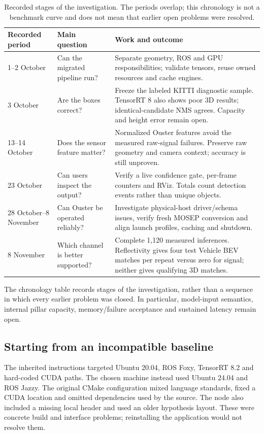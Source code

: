 \documentclass[11pt,a4paper]{article}
\newcommand{\code}[1]{\texttt{\detokenize{#1}}}
\begin{document}
\begin{table}[htbp]
\centering\small
\begin{tabularx}{\linewidth}{@{}p{.20\linewidth}p{.22\linewidth}Y@{}}
\toprule
Recorded period & Main question & Work and outcome \\ --2 October & Can the migrated pipeline run? & Separate geometry, ROS and GPU responsibilities; validate tensors, reuse owned resources and cache engines. \\
3 October & Are the boxes correct? & Freeze the labeled KITTI diagnostic sample. TensorRT 8 also shows poor 3D results; identical-candidate NMS agrees. Capacity and height error remain open. \\
13--14 October & Does the sensor feature matter? & Normalized Ouster features avoid the measured raw-signal failures. Preserve raw geometry and camera context; accuracy is still unproven. \\
23 October & Can users inspect the output? & Verify a live confidence gate, per-frame counters and RViz. Totals count detection events rather than unique objects. \\
28 October--8 November & Can Ouster be operated reliably? & Investigate physical-host driver/schema issues, verify fresh MOSEP conversion and align launch profiles, caching and shutdown. \\
8 November & Which channel is better supported? & Complete 1,120 measured inferences. Reflectivity gives four test Vehicle BEV matches per repeat versus zero for signal; neither gives qualifying 3D matches. \\
\bottomrule
\end{tabularx}
\caption{Recorded stages of the investigation. The periods overlap; this chronology is not a benchmark curve and does not mean that earlier open problems were resolved.}
\label{tab:journey-phases}
\end{table}

The chronology table records stages of the investigation, rather than a sequence in which every earlier problem was closed. In particular, model-input semantics, internal pillar capacity, memory/failure acceptance and sustained latency remain open.

\subsection{Starting from an incompatible baseline}

The inherited instructions targeted Ubuntu 20.04, ROS Foxy, TensorRT 8.2 and hard-coded CUDA paths. The chosen machine instead used Ubuntu 24.04 and ROS Jazzy. The original CMake configuration mixed language standards, fixed a CUDA location and omitted dependencies used by the source. The node also included a missing local header and used an older \code{vision_msgs} hypothesis layout. These were concrete build and interface problems; reinstalling the application would not resolve them.
\end{document}

